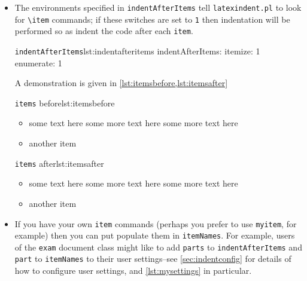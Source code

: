 \documentclass[11pt]{article}
\newcommand{\verbitem}[1]{\small\ttfamily{#1}}
\begin{document}
\begin{itemize}
  \item[\verbitem{indentAfterItems}] The environments specified in \lstinline!indentAfterItems!  tell
\lstinline!latexindent.pl! to look for \lstinline!\item! commands; if these switches are set to \lstinline!1!
then indentation will be performed so as indent the code after each \lstinline!item!.
    \begin{cmhlistings}{\lstinline!indentAfterItems!}{lst:indentafteritems}
indentAfterItems:
    itemize: 1
    enumerate: 1
    \end{cmhlistings}
A demonstration is given in \cref{lst:itemsbefore,lst:itemsafter}

	\begin{minipage}{.5\textwidth}
		\begin{cmhlistings}[style=demo,xleftmargin=-3mm,columns=fixed]{\lstinline!items! before}{lst:itemsbefore}
\begin{itemize}
\item some text here
some more text here
some more text here
\item another item
\end{itemize}
		\end{cmhlistings}
	\end{minipage}
	\begin{minipage}{.5\textwidth}
		\begin{cmhlistings}[style=demo,xleftmargin=-3mm,columns=fixed]{\lstinline!items! after}{lst:itemsafter}
\begin{itemize}
	\item some text here
		   some more text here
		   some more text here
	\item another item
\end{itemize}
		\end{cmhlistings}
	\end{minipage}

  \item[\verbitem{itemNames}] If you have your own \lstinline!item! commands (perhaps you 
    prefer to use \lstinline!myitem!, for example)
    then you can put populate them in \lstinline!itemNames!. 
    For example, users of the \lstinline!exam! document class might like to add 
\lstinline!parts! to \lstinline!indentAfterItems! and \lstinline!part! to \lstinline!itemNames! 
to their user settings--see \vref{sec:indentconfig} for details of how to configure user settings, 
and \vref{lst:mysettings} in particular.\label{page:examsettings}


\end{itemize}
\end{document}
